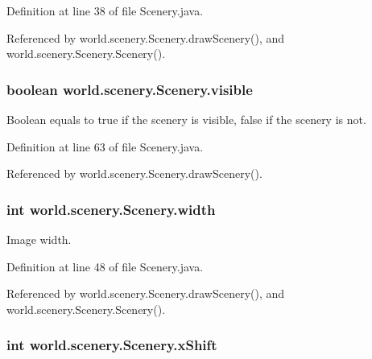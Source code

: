 Definition at line 38 of file Scenery.\-java.



Referenced by world.\-scenery.\-Scenery.\-draw\-Scenery(), and world.\-scenery.\-Scenery.\-Scenery().

\hypertarget{classworld_1_1scenery_1_1_scenery_a7b22a78d3126c947b7010fdbbea02218}{
\subsubsection[{visible}]{\setlength{\rightskip}{0pt plus 5cm}boolean world.\-scenery.\-Scenery.\-visible\hspace{0.3cm}{\ttfamily [protected]}}}\label{classworld_1_1scenery_1_1_scenery_a7b22a78d3126c947b7010fdbbea02218}


Boolean equals to true if the scenery is visible, false if the scenery is not. 



Definition at line 63 of file Scenery.\-java.



Referenced by world.\-scenery.\-Scenery.\-draw\-Scenery().

\hypertarget{classworld_1_1scenery_1_1_scenery_ad10b27080954e2fc06aa1718f47c4ce1}{
\subsubsection[{width}]{\setlength{\rightskip}{0pt plus 5cm}int world.\-scenery.\-Scenery.\-width\hspace{0.3cm}{\ttfamily [protected]}}}\label{classworld_1_1scenery_1_1_scenery_ad10b27080954e2fc06aa1718f47c4ce1}


Image width. 



Definition at line 48 of file Scenery.\-java.



Referenced by world.\-scenery.\-Scenery.\-draw\-Scenery(), and world.\-scenery.\-Scenery.\-Scenery().

\hypertarget{classworld_1_1scenery_1_1_scenery_a0999f105f7630fd67fd9d440da6983aa}{
\subsubsection[{x\-Shift}]{\setlength{\rightskip}{0pt plus 5cm}int world.\-scenery.\-Scenery.\-x\-Shift\hspace{0.3cm}{\ttfamily [protected]}}}\label{classworld_1_1scenery_1_1_scenery_a0999f105f7630fd67fd9d440da6983aa}


